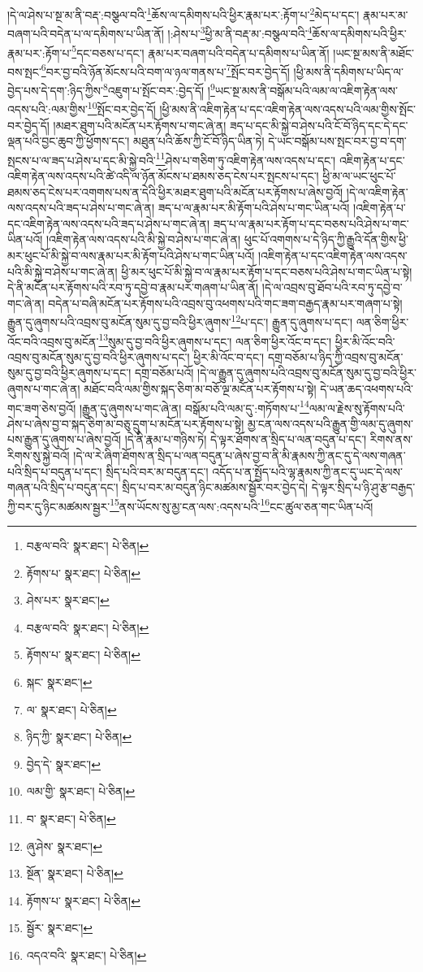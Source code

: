 །དེ་ལ་ཤེས་པ་སྔ་མ་ནི་བརྡ་:བསྩལ་བའི་\footnote{བརྩལ་བའི་  སྣར་ཐང་།  པེ་ཅིན། }ཆོས་ལ་དམིགས་པའི་ཕྱིར་རྣམ་པར་:རྟོག་པ་\footnote{རྟོགས་པ་  སྣར་ཐང་།  པེ་ཅིན། }མེད་པ་དང་། རྣམ་པར་མ་བཞག་པའི་བདེན་པ་ལ་དམིགས་པ་ཡིན་ནོ། །:ཤེས་པ་\footnote{ཤེས་པར་  སྣར་ཐང་། }ཕྱི་མ་ནི་བརྡ་མ་:བསྩལ་བའི་\footnote{བརྩལ་བའི་  སྣར་ཐང་།  པེ་ཅིན། }ཆོས་ལ་དམིགས་པའི་ཕྱིར་རྣམ་པར་:རྟོག་པ་\footnote{རྟོགས་པ་  སྣར་ཐང་།  པེ་ཅིན། }དང་བཅས་པ་དང་། རྣམ་པར་བཞག་པའི་བདེན་པ་དམིགས་པ་ཡིན་ནོ། །ཡང་སྔ་མས་ནི་མཐོང་བས་སྤང་\footnote{སྐང་  སྣར་ཐང་། }བར་བྱ་བའི་ཉོན་མོངས་པའི་བག་ལ་ཉལ་གནས་པ་\footnote{ལ་  སྣར་ཐང་།  པེ་ཅིན། }སྤོང་བར་བྱེད་དོ། །ཕྱི་མས་ནི་དམིགས་པ་ཡིད་ལ་བྱེད་པས་དེ་དག་:ཉིད་ཀྱིས་\footnote{ཉིད་ཀྱི་  སྣར་ཐང་།  པེ་ཅིན། }འཇུག་པ་སྤོང་བར་:བྱེད་དོ། །\footnote{བྱེད་དེ་  སྣར་ཐང་། }ཡང་སྔ་མས་ནི་བསྒོམ་པའི་ལམ་ལ་འཇིག་རྟེན་ལས་འདས་པའི་:ལམ་གྱིས་\footnote{ལམ་གྱི་  སྣར་ཐང་།  པེ་ཅིན། }སྤོང་བར་བྱེད་དོ། །ཕྱི་མས་ནི་འཇིག་རྟེན་པ་དང་འཇིག་རྟེན་ལས་འདས་པའི་ལམ་གྱིས་སྤོང་བར་བྱེད་དོ། །མཐར་ཐུག་པའི་མངོན་པར་རྟོགས་པ་གང་ཞེ་ན། ཟད་པ་དང་མི་སྐྱེ་བ་ཤེས་པའི་ངོ་བོ་ཉིད་དང་དེ་དང་ལྡན་པའི་བྱང་ཆུབ་ཀྱི་ཕྱོགས་དང་། མཐུན་པའི་ཆོས་ཀྱི་ངོ་བོ་ཉིད་ཡིན་ཏེ། དེ་ཡང་བསྒོམ་པས་སྤང་བར་བྱ་བ་དག་སྤངས་པ་ལ་ཟད་པ་ཤེས་པ་དང་མི་སྐྱེ་བའི་\footnote{བ་  སྣར་ཐང་།  པེ་ཅིན། }ཤེས་པ་གཅིག་ཏུ་འཇིག་རྟེན་ལས་འདས་པ་དང་། འཇིག་རྟེན་པ་དང་འཇིག་རྟེན་ལས་འདས་པའི་ཚེ་འདི་ལ་ཉོན་མོངས་པ་ཐམས་ཅད་ངེས་པར་སྤངས་པ་དང་། ཕྱི་མ་ལ་ཡང་ཕུང་པོ་ཐམས་ཅད་ངེས་པར་འགགས་པས་ན་དེའི་ཕྱིར་མཐར་ཐུག་པའི་མངོན་པར་རྟོགས་པ་ཞེས་བྱའོ། །དེ་ལ་འཇིག་རྟེན་ལས་འདས་པའི་ཟད་པ་ཤེས་པ་གང་ཞེ་ན། ཟད་པ་ལ་རྣམ་པར་མི་རྟོག་པའི་ཤེས་པ་གང་ཡིན་པའོ། །འཇིག་རྟེན་པ་དང་འཇིག་རྟེན་ལས་འདས་པའི་ཟད་པ་ཤེས་པ་གང་ཞེ་ན། ཟད་པ་ལ་རྣམ་པར་རྟོག་པ་དང་བཅས་པའི་ཤེས་པ་གང་ཡིན་པའོ། །འཇིག་རྟེན་ལས་འདས་པའི་མི་སྐྱེ་བ་ཤེས་པ་གང་ཞེ་ན། ཕུང་པོ་འགགས་པ་དེ་ཉིད་ཀྱི་རྒྱུའི་དོན་གྱིས་ཕྱི་མར་ཕུང་པོ་མི་སྐྱེ་བ་ལས་རྣམ་པར་མི་རྟོག་པའི་ཤེས་པ་གང་ཡིན་པའོ། །འཇིག་རྟེན་པ་དང་འཇིག་རྟེན་ལས་འདས་པའི་མི་སྐྱེ་བ་ཤེས་པ་གང་ཞེ་ན། ཕྱི་མར་ཕུང་པོ་མི་སྐྱེ་བ་ལ་རྣམ་པར་རྟོག་པ་དང་བཅས་པའི་ཤེས་པ་གང་ཡིན་པ་སྟེ། དེ་ནི་མངོན་པར་རྟོགས་པའི་རབ་ཏུ་དབྱེ་བ་རྣམ་པར་གཞག་པ་ཡིན་ནོ། །དེ་ལ་འབྲས་བུ་ཐོབ་པའི་རབ་ཏུ་དབྱེ་བ་གང་ཞེ་ན། བདེན་པ་བཞི་མངོན་པར་རྟོགས་པའི་འབྲས་བུ་འཕགས་པའི་གང་ཟག་བརྒྱད་རྣམ་པར་གཞག་པ་སྟེ། རྒྱུན་དུ་ཞུགས་པའི་འབྲས་བུ་མངོན་སུམ་དུ་བྱ་བའི་ཕྱིར་ཞུགས་\footnote{ཞུ་ཤེས་  སྣར་ཐང་། }པ་དང་། རྒྱུན་དུ་ཞུགས་པ་དང་། ལན་ཅིག་ཕྱིར་འོང་བའི་འབྲས་བུ་མངོན་\footnote{སྔོན་  སྣར་ཐང་།  པེ་ཅིན། }སུམ་དུ་བྱ་བའི་ཕྱིར་ཞུགས་པ་དང་། ལན་ཅིག་ཕྱིར་འོང་བ་དང་། ཕྱིར་མི་འོང་བའི་འབྲས་བུ་མངོན་སུམ་དུ་བྱ་བའི་ཕྱིར་ཞུགས་པ་དང་། ཕྱིར་མི་འོང་བ་དང་། དགྲ་བཅོམ་པ་ཉིད་ཀྱི་འབྲས་བུ་མངོན་སུམ་དུ་བྱ་བའི་ཕྱིར་ཞུགས་པ་དང་། དགྲ་བཅོམ་པའོ། །དེ་ལ་རྒྱུན་དུ་ཞུགས་པའི་འབྲས་བུ་མངོན་སུམ་དུ་བྱ་བའི་ཕྱིར་ཞུགས་པ་གང་ཞེ་ན། མཐོང་བའི་ལམ་གྱིས་སྐད་ཅིག་མ་བཅོ་ལྔ་མངོན་པར་རྟོགས་པ་སྟེ། དེ་ཡན་ཆད་འཕགས་པའི་གང་ཟག་ཅེས་བྱའོ། །རྒྱུན་དུ་ཞུགས་པ་གང་ཞེ་ན། བསྒོམ་པའི་ལམ་དུ་:གཏོགས་པ་\footnote{རྟོགས་པ་  སྣར་ཐང་།  པེ་ཅིན། }ལམ་ལ་རྗེས་སུ་རྟོགས་པའི་ཤེས་པ་ཞེས་བྱ་བ་སྐད་ཅིག་མ་བཅུ་དྲུག་པ་མངོན་པར་རྟོགས་པ་སྟེ། མྱ་ངན་ལས་འདས་པའི་རྒྱུན་གྱི་ལམ་དུ་ཞུགས་པས་རྒྱུན་དུ་ཞུགས་པ་ཞེས་བྱའོ། །དེ་ནི་རྣམ་པ་གཉིས་ཏེ། དེ་ལྟར་ཐོགས་ན་སྲིད་པ་ལན་བདུན་པ་དང་། རིགས་ནས་རིགས་སུ་སྐྱེ་བའོ། །དེ་ལ་རེ་ཞིག་ཐོགས་ན་སྲིད་པ་ལན་བདུན་པ་ཞེས་བྱ་བ་ནི་མི་རྣམས་ཀྱི་ནང་དུ་དེ་ལས་གཞན་པའི་སྲིད་པ་བདུན་པ་དང་། སྲིད་པའི་བར་མ་བདུན་དང་། འདོད་པ་ན་སྤྱོད་པའི་ལྷ་རྣམས་ཀྱི་ནང་དུ་ཡང་དེ་ལས་གཞན་པའི་སྲིད་པ་བདུན་དང་། སྲིད་པ་བར་མ་བདུན་ཉིང་མཚམས་སྦྱོར་བར་བྱེད་དེ། དེ་ལྟར་སྲིད་པ་ཉི་ཤུ་རྩ་བརྒྱད་ཀྱི་བར་དུ་ཉིང་མཚམས་སྦྱར་\footnote{སྦྱོར་  སྣར་ཐང་། }ནས་ཡོངས་སུ་མྱ་ངན་ལས་:འདས་པའི་\footnote{འདའ་བའི་  སྣར་ཐང་།  པེ་ཅིན། }ངང་ཚུལ་ཅན་གང་ཡིན་པའོ། 